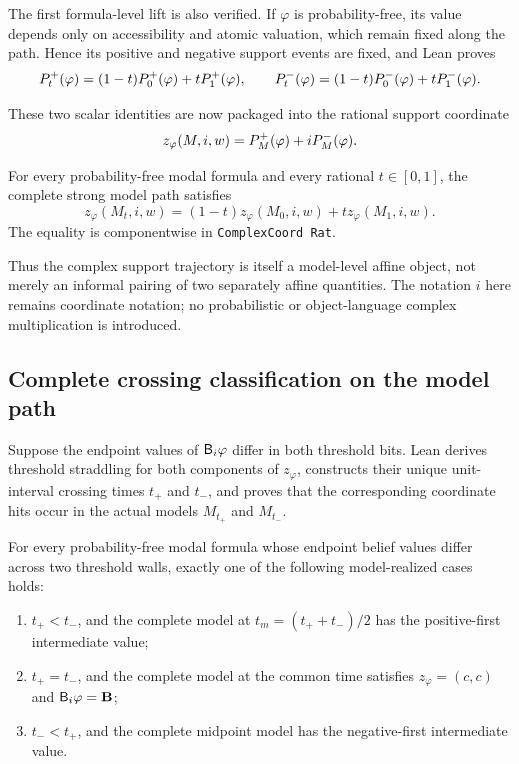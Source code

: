 The first formula-level lift is also verified. If \(\varphi\) is
probability-free, its value depends only on accessibility and atomic valuation,
which remain fixed along the path. Hence its positive and negative support
events are fixed, and Lean proves
\[
  P^{+}_t(\varphi)=(1-t)P^{+}_0(\varphi)+tP^{+}_1(\varphi),
  \qquad
  P^{-}_t(\varphi)=(1-t)P^{-}_0(\varphi)+tP^{-}_1(\varphi).
\]

These two scalar identities are now packaged into the rational support
coordinate
\[
  z_\varphi(M,i,w)=P^{+}_M(\varphi)+iP^{-}_M(\varphi).
\]

\begin{theorem}
For every probability-free modal formula and every rational \(t\in[0,1]\),
the complete strong model path satisfies
\[
  z_\varphi(M_t,i,w)
  =(1-t)z_\varphi(M_0,i,w)+t z_\varphi(M_1,i,w).
\]
The equality is componentwise in \texttt{ComplexCoord Rat}.
\statusverified
\end{theorem}

Thus the complex support trajectory is itself a model-level affine object, not
merely an informal pairing of two separately affine quantities. The notation
\(i\) here remains coordinate notation; no probabilistic or object-language
complex multiplication is introduced.

\subsection{Complete crossing classification on the model path}

Suppose the endpoint values of \(\mathsf{B}_i\varphi\) differ in both threshold
bits. Lean derives threshold straddling for both components of
\(z_\varphi\), constructs their unique unit-interval crossing times
\(t_+\) and \(t_-\), and proves that the corresponding coordinate hits occur
in the actual models \(M_{t_+}\) and \(M_{t_-}\).

\begin{theorem}
For every probability-free modal formula whose endpoint belief values differ
across two threshold walls, exactly one of the following model-realized cases
holds:
\begin{enumerate}[label=(\roman*)]
  \item \(t_+<t_-\), and the complete model at
  \(t_m=(t_++t_-)/2\) has the positive-first intermediate value;
  \item \(t_+=t_-\), and the complete model at the common time satisfies
  \(z_\varphi=(c,c)\) and \(\mathsf{B}_i\varphi=\mathbf{B}\);
  \item \(t_-<t_+\), and the complete midpoint model has the negative-first
  intermediate value.
\end{enumerate}
\statusverified
\end{theorem}


